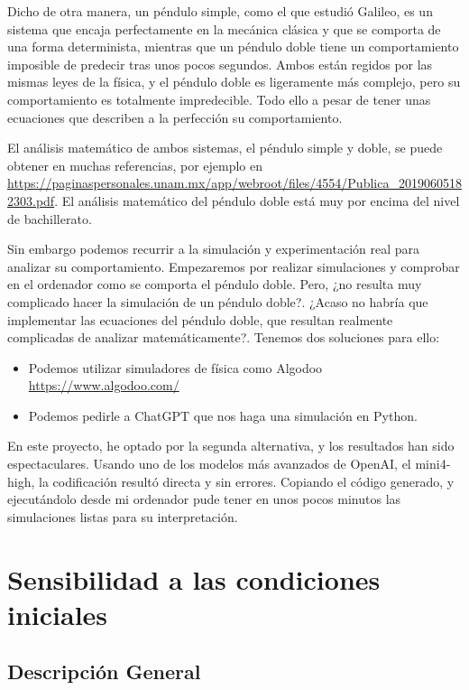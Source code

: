 \documentclass[
  10pt,
  a4paper,
  DIV=11,
  numbers=noendperiod,
  open=any]{scrreprt}
\providecommand{\tightlist}{%
  \setlength{\itemsep}{0pt}\setlength{\parskip}{0pt}}
\numberwithin{equation}{chapter}
\numberwithin{equation}{section}
\renewcommand{\[}{\begin{equation}}
\renewcommand{\]}{\end{equation}}
\begin{document}
Dicho de otra manera, un péndulo simple, como el que estudió Galileo, es
un sistema que encaja perfectamente en la mecánica clásica y que se
comporta de una forma determinista, mientras que un péndulo doble tiene
un comportamiento imposible de predecir tras unos pocos segundos. Ambos
están regidos por las mismas leyes de la física, y el péndulo doble es
ligeramente más complejo, pero su comportamiento es totalmente
impredecible. Todo ello a pesar de tener unas ecuaciones que describen a
la perfección su comportamiento.

El análisis matemático de ambos sistemas, el péndulo simple y doble, se
puede obtener en muchas referencias, por ejemplo en
\url{https://paginaspersonales.unam.mx/app/webroot/files/4554/Publica_20190605182303.pdf}.
El análisis matemático del péndulo doble está muy por encima del nivel
de bachillerato.

Sin embargo podemos recurrir a la simulación y experimentación real para
analizar su comportamiento. Empezaremos por realizar simulaciones y
comprobar en el ordenador como se comporta el péndulo doble. Pero, ¿no
resulta muy complicado hacer la simulación de un péndulo doble?. ¿Acaso
no habría que implementar las ecuaciones del péndulo doble, que resultan
realmente complicadas de analizar matemáticamente?. Tenemos dos
soluciones para ello:

\begin{itemize}
\tightlist
\item
  Podemos utilizar simuladores de física como Algodoo
  \url{https://www.algodoo.com/}
\item
  Podemos pedirle a ChatGPT que nos haga una simulación en Python.
\end{itemize}

En este proyecto, he optado por la segunda alternativa, y los resultados
han sido espectaculares. Usando uno de los modelos más avanzados de
OpenAI, el mini4-high, la codificación resultó directa y sin errores.
Copiando el código generado, y ejecutándolo desde mi ordenador pude
tener en unos pocos minutos las simulaciones listas para su interpretación.  

\chapter{Sensibilidad a las condiciones
iniciales}\label{sensibilidad-a-las-condiciones-iniciales}


\section{Descripción General}\label{descripciuxf3n-general}
\end{document}
